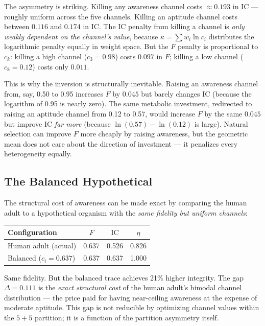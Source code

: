 \documentclass[
  aps,
  prd,
  twocolumn,
  superscriptaddress,
  nofootinbib,
  floatfix
]{revtex4-2}
\newcommand{\IC}{\mathrm{IC}}
\begin{document}
The asymmetry is striking.  Killing any awareness channel
costs $\approx 0.193$ in $\IC$ --- roughly uniform across
the five channels.  Killing an aptitude channel costs between
$0.116$ and $0.174$ in $\IC$.  The $\IC$ penalty from killing
a channel is \emph{only weakly dependent on the channel's
value}, because $\kappa = \sum w_i \ln c_i$ distributes the
logarithmic penalty equally in weight space.  But the $F$
penalty is proportional to $c_k$: killing a high channel
($c_3 = 0.98$) costs $0.097$ in $F$; killing a low channel
($c_8 = 0.12$) costs only $0.011$.

This is why the inversion is structurally inevitable.
Raising an awareness channel from, say, 0.50 to 0.95
increases $F$ by $0.045$ but barely changes $\IC$ (because
the logarithm of 0.95 is nearly zero).  The same metabolic
investment, redirected to raising an aptitude channel from
0.12 to 0.57, would increase $F$ by the same $0.045$ but
improve $\IC$ \emph{far more} (because $\ln(0.57) -
\ln(0.12)$ is large).  Natural selection can improve $F$
more cheaply by raising awareness, but the geometric mean
does not care about the direction of investment --- it
penalizes every heterogeneity equally.

\subsection{The Balanced Hypothetical}

The structural cost of awareness can be made exact by
comparing the human adult to a hypothetical organism with
the \emph{same fidelity but uniform channels}:

\begin{center}
\begin{tabular}{lccc}
\toprule
Configuration & $F$ & $\IC$ & $\eta$ \\
\midrule
Human adult (actual) & 0.637 & 0.526 & 0.826 \\
Balanced ($c_i = 0.637$) & 0.637 & 0.637 & 1.000 \\
\bottomrule
\end{tabular}
\end{center}

Same fidelity.  But the balanced trace achieves 21\% higher
integrity.  The gap $\Delta = 0.111$ is the \emph{exact
structural cost} of the human adult's bimodal channel
distribution --- the price paid for having near-ceiling
awareness at the expense of moderate aptitude.  This gap
is not reducible by optimizing channel values within the
$5\!+\!5$ partition; it is a function of the partition
asymmetry itself.
\end{document}
